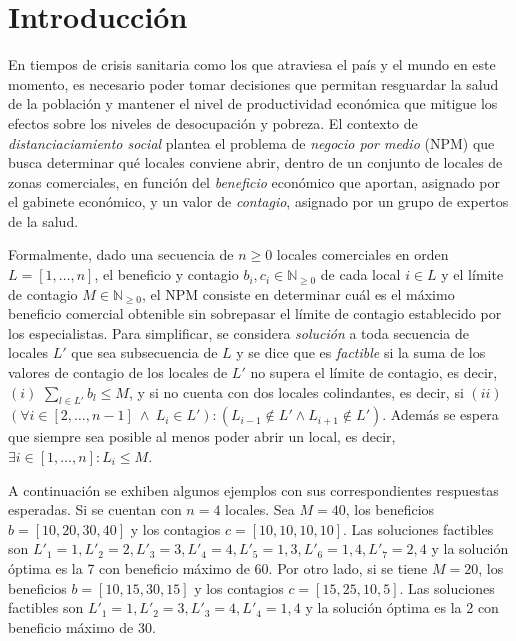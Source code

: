 \clearpage
\setcounter{page}{1}

\section{Introducción}

En tiempos de crisis sanitaria como los que atraviesa el país y el mundo en este momento, es necesario poder tomar decisiones que permitan resguardar la salud de la población y mantener el nivel de productividad económica que mitigue los efectos sobre los niveles de desocupación y pobreza. El contexto de \textit{distanciaciamiento social} plantea el problema de \textit{negocio por medio} (NPM) que busca determinar qué locales conviene abrir, dentro de un conjunto de locales de zonas comerciales, en función del \textit{beneficio} económico que aportan, asignado por el gabinete económico, y un valor de \textit{contagio}, asignado por un grupo de expertos de la salud.

Formalmente, dado una secuencia de $n \ge 0$ locales comerciales en orden $L = [ 1, \dots, n]$, el beneficio y contagio $b_i, c_i \in \mathbb{N} _{\ge0}$ de cada local $i \in L$ y el límite de contagio $M \in \mathbb{N}_{\ge 0}$, el NPM consiste en determinar cuál es el máximo beneficio comercial obtenible sin sobrepasar el límite de contagio establecido por los especialistas. Para simplificar, se considera \textit{solución} a toda secuencia de locales $L'$ que sea subsecuencia de $L$ y se dice que es \textit{factible} si la suma de los valores de contagio de los locales de $L'$ no supera el límite de contagio, es decir, $(i)$ $\sum_{l\in L'}b_l \le M$, y si no cuenta con dos locales colindantes, es decir, si $(ii)$ $(\forall i \in [2,\dots, n-1]~\wedge~L_i \in L') : (L_{i-1} \not \in L' \wedge L_{i+1} \not \in L')$. Además se espera que siempre sea posible al menos poder abrir un local, es decir, $\exists i \in [1,\dots,n] : L_i \le M$.

A continuación se exhiben algunos ejemplos con sus correspondientes respuestas esperadas. Si se cuentan con $n=4$ locales. Sea $M=40$, los beneficios $b=[10, 20, 30, 40]$ y los contagios $c=[10,10,10,10]$. Las soluciones factibles son $L'_1={1}, L'_2={2}, L'_3={3}, L'_4={4}, L'_5={1,3}, L'_6={1,4}, L'_7={2,4}$ y la solución óptima es la 7 con beneficio máximo de 60. Por otro lado, si se tiene $M=20$, los beneficios $b=[10, 15, 30, 15]$ y los contagios $c=[15,25,10,5]$. Las soluciones factibles son $L'_1={1}, L'_2={3}, L'_3={4}, L'_4={1,4}$ y la solución óptima es la 2 con beneficio máximo de 30.

